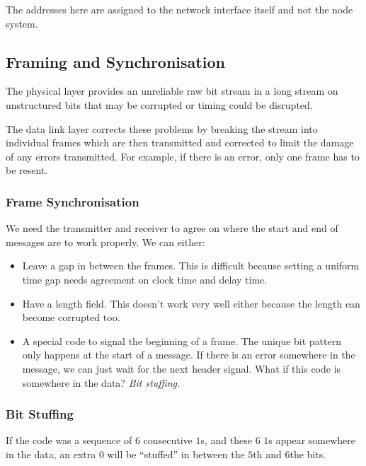 \begin{note}
    The addresses here are assigned to the network interface itself and not the node system.
\end{note}

\subsection{Framing and Synchronisation}\label{sub:framing_and_synchronisation}

The physical layer provides an unreliable raw bit stream in a long stream on unstructured bits that may be corrupted or timing could be disrupted.

The data link layer corrects these problems by breaking the stream into individual frames which are then transmitted and corrected to limit the damage of any errors transmitted.
For example, if there is an error, only one frame has to be resent.

\subsubsection{Frame Synchronisation}\label{ssub:frame_synchronisation}

We need the transmitter and receiver to agree on where the start and end of messages are to work properly.
We can either:
\begin{itemize}
    \item Leave a gap in between the frames.
          This is difficult because setting a uniform time gap needs agreement on clock time and delay time.
    \item Have a length field.
          This doesn't work very well either because the length can become corrupted too.
    \item A special code to signal the beginning of a frame.
          The unique bit pattern only happens at the start of a message.
          If there is an error somewhere in the message, we can just wait for the next header signal.
          What if this code is somewhere in the data? \emph{Bit stuffing.}
\end{itemize}

\subsubsection{Bit Stuffing}\label{ssub:bit_stuffing}

If the code was a sequence of \(6\) consecutive \(1\)s, and these \(6\) \(1\)s appear somewhere in the data, an extra \(0\) will be ``stuffed'' in between the \(5\)th and \(6\)the bits.

